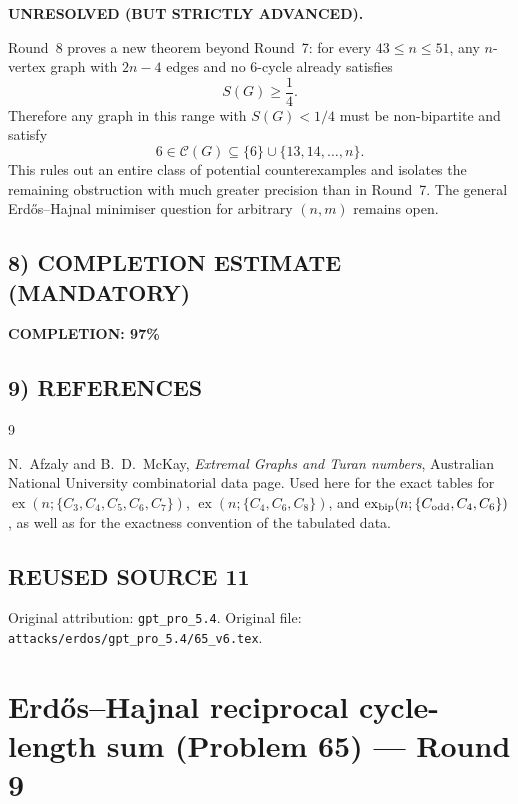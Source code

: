 \textbf{UNRESOLVED (BUT STRICTLY ADVANCED).}

Round~8 proves a new theorem beyond Round~7:
for every $43\le n\le 51$, any $n$-vertex graph with $2n-4$ edges and no $6$-cycle already satisfies
\[
S(G)\ge \frac14.
\]
Therefore any graph in this range with $S(G)<1/4$ must be non-bipartite and satisfy
\[
6\in\mathcal C(G)\subseteq \{6\}\cup\{13,14,\dots,n\}.
\]
This rules out an entire class of potential counterexamples and isolates the remaining obstruction with much greater precision than in Round~7.
The general Erd\H{o}s--Hajnal minimiser question for arbitrary $(n,m)$ remains open.

\subsection*{8) COMPLETION ESTIMATE (MANDATORY)}

\textbf{COMPLETION: 97\%}

\subsection*{9) REFERENCES}

\begin{thebibliography}{9}

N.~Afzaly and B.~D.~McKay,
\emph{Extremal Graphs and Turan numbers},
Australian National University combinatorial data page.
Used here for the exact tables for
$\operatorname{ex}(n;\{C_3,C_4,C_5,C_6,C_7\})$,
$\operatorname{ex}(n;\{C_4,C_6,C_8\})$,
and
$\operatorname{ex}_{\rm bip}(n;\{C_{\mathrm{odd}},C_4,C_6\})$,
as well as for the exactness convention of the tabulated data.

\end{thebibliography}


\subsection*{REUSED SOURCE 11}
Original attribution: \texttt{gpt\_pro\_5.4}.
Original file: \texttt{attacks/erdos/gpt\_pro\_5.4/65\_v6.tex}.

\section{Erd\H{o}s--Hajnal reciprocal cycle-length sum (Problem 65) --- Round 9}


